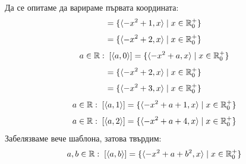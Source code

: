 \begin{example}
    Да се опитаме да варираме първата координата:
    \begin{equation}
        [\langle 1, 0 \rangle] = \{ \langle -x^2 + 1, x \rangle \mid x \in \R_0^+\}
    \end{equation}
    \begin{equation}
        [\langle 2, 0 \rangle] = \{ \langle -x^2 + 2, x \rangle \mid x \in \R_0^+\}
    \end{equation}
    \begin{equation}
        a\in {\mathbb{R}}:\; [\langle a, 0 \rangle] = \{ \langle -x^2 + a, x \rangle \mid x \in {\mathbb{R}}_0^+\}
    \end{equation}
    \begin{equation}
        [\langle 1, 1 \rangle] = \{ \langle -x^2 + 2, x \rangle \mid x \in \R_0^+\}
    \end{equation}
    \begin{equation}
        [\langle 2, 1 \rangle] = \{ \langle -x^2 + 3, x \rangle \mid x \in \R_0^+\}
    \end{equation}
    \begin{equation}
        a \in {\mathbb{R}}:\; [\langle a, 1 \rangle] = \{ \langle -x^2 + a + 1, x \rangle \mid x \in {\mathbb{R}}_0^+\}
    \end{equation}
    \begin{equation}
        a \in {\mathbb{R}}:\; [\langle a, 2 \rangle] = \{ \langle -x^2 + a + 4, x \rangle \mid x \in {\mathbb{R}}_0^+\}
    \end{equation}
    Забелязваме вече шаблона, затова твърдим:
    \begin{equation}
        a, b \in {\mathbb{R}}:\; [\langle a, b \rangle] = \{ \langle -x^2 + a + b^2, x \rangle \mid x \in {\mathbb{R}}_0^+\}
    \end{equation}

\end{example}